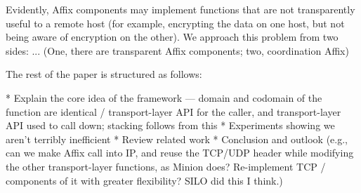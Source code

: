 Evidently, Affix components may implement functions that are not
transparently useful to a remote host (for example, encrypting the
data on one host, but not being aware of encryption on the other).
We approach this problem from two sides: ... (One, there are
transparent Affix components; two, coordination Affix)

The rest of the paper is structured as follows:

* Explain the core idea of the framework --- domain and codomain
of the function are identical / transport-layer API for the caller,
and transport-layer API used to call down; stacking follows from
this * Experiments showing we aren't terribly inefficient * Review
related work * Conclusion and outlook (e.g., can we make Affix call
into IP, and reuse the TCP/UDP header while modifying the other
transport-layer functions, as Minion does? Re-implement TCP /
components of it with greater flexibility? SILO did this I think.)


